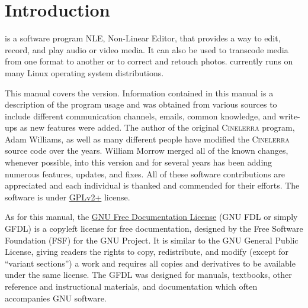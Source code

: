 \chapter*{Introduction}%
\label{cha:introduction}

\CGG{} is a software program NLE, Non-Linear Editor, that provides a
way to edit, record, and play audio or video media.  It can also be
used to transcode media from one format to another or to correct and
retouch photos. \CGG{} currently runs on many Linux operating system
distributions.

This manual covers the \CGG{} \INF{} version.  Information
contained in this manual is a description of the \CGG{} program
usage and was obtained from various sources to include different
communication channels, emails, common knowledge, and write-ups as
new features were added.  The author of the original
\textsc{Cinelerra} program, Adam Williams, as well as many different
people have modified the \textsc{Cinelerra} source code over the
years.  William Morrow merged all of the known changes, whenever
possible, into this \CGG{} version and for several years has been
adding numerous features, updates, and fixes.  All of these software
contributions are appreciated and each individual is thanked and
commended for their efforts.  The \CGG{} software is under \href{https://www.gnu.org/licenses/old-licenses/gpl-2.0-standalone.html}{GPLv2+}
license.

As for this manual, the
\href{https://www.gnu.org/licenses/fdl-1.3.en.html}{GNU Free
  Documentation License} (GNU FDL or simply GFDL) is a copyleft
license for free documentation, designed by the Free Software
Foundation (FSF) for the GNU Project. It is similar to the GNU
General Public License, giving readers the rights to copy,
redistribute, and modify (except for ``variant sections'') a work
and requires all copies and derivatives to be available under the
same license.  The GFDL was designed for manuals, textbooks, other
reference and instructional materials, and documentation which often
accompanies GNU software.

